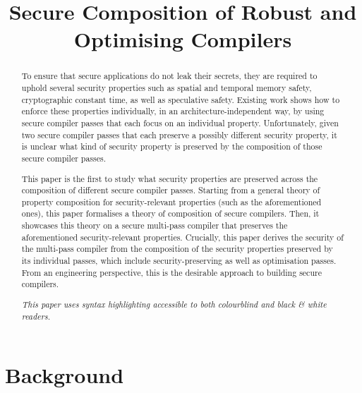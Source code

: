 \documentclass[a4paper,12pt]{article}
\title{Secure Composition of Robust and Optimising Compilers}
\begin{document}
\maketitle

\begin{abstract}
To ensure that secure applications do not leak their secrets, they are required to uphold several security properties such as spatial and temporal memory safety, cryptographic constant time, as well as speculative safety.
Existing work shows how to enforce these properties individually, in an architecture-independent way, by using secure compiler passes that each focus on an individual property.
Unfortunately, given two secure compiler passes that each preserve a possibly different security property, it is unclear what kind of security property is preserved by the composition of those secure compiler passes.

This paper is the first to study what security properties are preserved across the composition of different secure compiler passes.
Starting from a general theory of property composition for security-relevant properties (such as the aforementioned ones), this paper formalises a theory of composition of secure compilers.
Then, it showcases this theory on a secure multi-pass compiler that preserves the aforementioned security-relevant properties.
Crucially, this paper derives the security of the multi-pass compiler from the composition of the security properties preserved by its individual passes, which include security-preserving as well as optimisation passes.
% 
From an engineering perspective, this is the desirable approach to building secure compilers.
\begin{center}\small\it
	{This paper uses syntax highlighting accessible to both colourblind and black \& white readers.}
\end{center}
\end{abstract}

\appendix

\section{Background}







\end{document}
